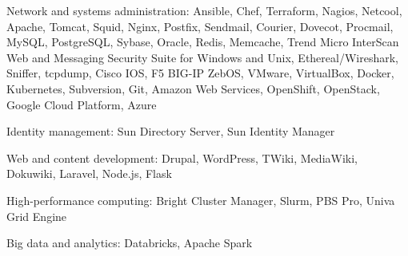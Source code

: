 \documentclass[10pt, a4paper, final]{article}
\begin{document}
\begin{section}
\begin{subsection}
\begin{compactitem}
      \item Network and systems administration: Ansible, Chef, Terraform, Nagios, Netcool, Apache, Tomcat, Squid, Nginx, Postfix, Sendmail, Courier, Dovecot, Procmail, MySQL, PostgreSQL, Sybase, Oracle, Redis, Memcache, Trend Micro InterScan Web and Messaging Security Suite for Windows and Unix, Ethereal/Wireshark, Sniffer, tcpdump, Cisco IOS, F5 BIG-IP ZebOS, VMware, VirtualBox, Docker, Kubernetes, Subversion, Git, Amazon Web Services, OpenShift, OpenStack, Google Cloud Platform, Azure
      \item Identity management: Sun Directory Server, Sun Identity Manager
      \item Web and content development: Drupal, WordPress, TWiki, MediaWiki, Dokuwiki, Laravel, Node.js, Flask
      \item High-performance computing: Bright Cluster Manager, Slurm, PBS Pro, Univa Grid Engine
      \item Big data and analytics: Databricks, Apache Spark
    \end{compactitem}
  \end{subsection}
\end{section}
\end{document}
